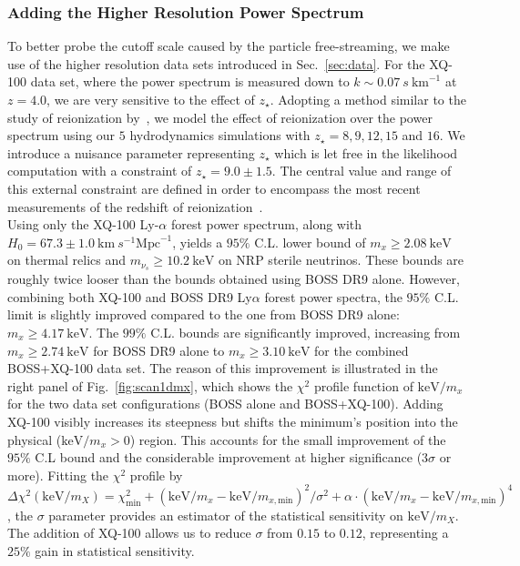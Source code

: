 \subsubsection{Adding the Higher Resolution Power Spectrum}

To better probe the cutoff scale caused by the particle free-streaming,
we make use of the higher resolution data sets introduced in Sec.~\ref{sec:data}.  For the  XQ-100 data set, where the power spectrum is measured down to $k \sim 0.07~s~\mathrm{km}^{-1}$ at $z=4.0$, we are very sensitive to the effect of $z_\star$. Adopting a method similar to the study of reionization by~\cite{McDonald2005}, we model the effect of reionization over the power spectrum using our $5$ hydrodynamics simulations with $z_{\star} = 8, 9, 12, 15$ and $16$. We introduce a nuisance parameter representing $z_{\star}$ which is let free in the likelihood computation with a constraint of $z_{\star} = 9.0 \pm 1.5$.  The central value and range of this external constraint are defined in order to encompass the most recent measurements of the redshift of reionization~\cite{WMAP9, Planck2015, Planck2016PolarReio}. \\


Using only the XQ-100 Ly-$\alpha$ forest power spectrum, along with $H_0 = 67.3 \pm 1.0 ~\mathrm{km}~s^{-1}\mathrm{Mpc}^{-1}$, yields a $95\%$ C.L. lower bound of $m_x \geqslant 2.08 ~\mathrm{keV}$ on thermal relics and $m_{\nu_s} \geqslant 10.2 ~\mathrm{keV}$ on NRP sterile neutrinos. These bounds are roughly twice looser than the bounds obtained using BOSS DR9 alone. However, combining both XQ-100 and BOSS DR9 Ly$\alpha$ forest power spectra, the $95\%$ C.L. limit is slightly improved compared to the one from BOSS DR9 alone: $m_x \geqslant 4.17~\mathrm{keV}$. The $99\%$ C.L. bounds are significantly improved, increasing from $m_x \geqslant 2.74 ~\mathrm{keV}$ for BOSS DR9 alone to $m_x \geqslant 3.10 ~\mathrm{keV}$ for the combined BOSS+XQ-100 data set.  The reason of this improvement is illustrated in the right panel of Fig.~\ref{fig:scan1dmx}, which shows the $\chi^2$ profile function of $\mathrm{keV}/m_x$ for the two data set configurations (BOSS alone and BOSS+XQ-100). Adding XQ-100 visibly increases its steepness but shifts the minimum's position into the physical ($\mathrm{keV}/m_x > 0$) region. This accounts for the small improvement of the $95\%$ C.L bound and the considerable improvement at higher significance ($3\sigma$ or more). Fitting the $\chi^2$ profile by $\Delta \chi^2 (\mathrm{keV}/m_X) =\chi^2_{\mathrm{min}} + (\mathrm{keV}/m_x-\mathrm{keV}/m_{x, \mathrm{min}})^2/\sigma^2+\alpha\cdot(\mathrm{keV}/m_x-\mathrm{keV}/m_{x, \mathrm{min}})^4$, the $\sigma$ parameter provides an estimator of the statistical sensitivity on $\mathrm{keV}/m_X$. The addition of XQ-100 allows us to reduce $\sigma$ from $0.15$ to $0.12$, representing a  $25\%$ gain in statistical sensitivity. \\

